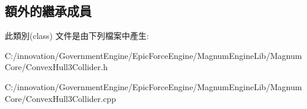 \subsection*{額外的繼承成員}


此類別(class) 文件是由下列檔案中產生\+:\begin{DoxyCompactItemize}
\item 
C\+:/innovation/\+Government\+Engine/\+Epic\+Force\+Engine/\+Magnum\+Engine\+Lib/\+Magnum\+Core/Convex\+Hull3\+Collider.\+h\item 
C\+:/innovation/\+Government\+Engine/\+Epic\+Force\+Engine/\+Magnum\+Engine\+Lib/\+Magnum\+Core/Convex\+Hull3\+Collider.\+cpp\end{DoxyCompactItemize}
